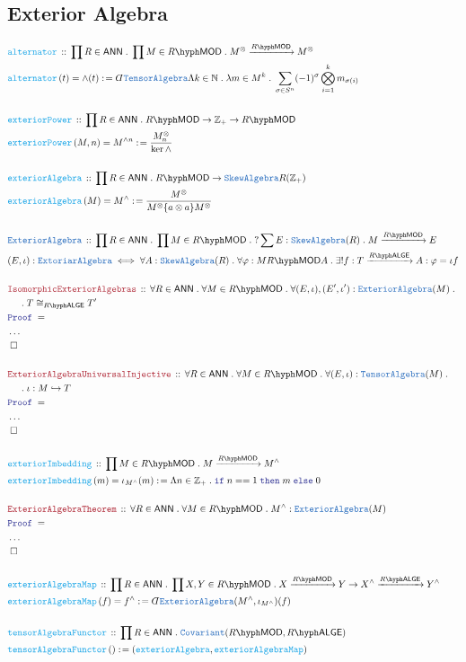 \documentclass[12pt]{scrartcl}%
\newcommand{\TYPE}[1]{\textcolor{NavyBlue}{\mathtt{#1}}}%
\newcommand{\FUNC}[1]{\textcolor{Cerulean}{\mathtt{#1}}}%
\newcommand{\LOGIC}[1]{\textcolor{Blue}{\mathtt{#1}}}%
\newcommand{\THM}[1]{\textcolor{Maroon}{\mathtt{#1}}}%
\renewcommand{\.}{\; . \;} %
\newcommand{\de}{: \kern 0.1pc =} %
\newcommand{\If}{\LOGIC{if} \;} %
\newcommand{\Then}{ \; \LOGIC{then} \;} %
\newcommand{\Else}{\; \LOGIC{else} \;} %
\newcommand{\Act}[1]{\left( #1 \right)} %
\newcommand{\Theorem}[2]{& \THM{#1} \, :: \, #2 \\ & \Proof = \\ } %
\newcommand{\DeclareType}[2]{& \TYPE{#1} \, :: \, #2 \\}%
\newcommand{\DefineType}[3]{& #1 : \TYPE{#2} \iff #3 \\}%
\newcommand{\DeclareFunc}[2]{& \FUNC{#1} \, :: \, #2 \\}%
\newcommand{\DefineFunc}[3]{&  \FUNC{#1}\Act{#2} \de #3 \\}%
\newcommand{\DefineNamedFunc}[4]{&  \FUNC{#1}\Act{#2} = #3 \de #4 \\}%
\newcommand{\NewLine}{\\ & \kern 1pc}%
\newcommand{\Page}[1]{ \begin{align*} #1 \end{align*}  }%
\newcommand{ \bd }{ \ByDef }%
\newcommand{\NoProof}{ & \ldots \\ \EndProof}%
\newcommand{\Int}{\mathbb{Z}}%
\newcommand{\Nat}{\mathbb{N}}%
\newcommand{\ToInj}{\hookrightarrow} %
\newcommand{\QED}{\; \square} %
\newcommand{\EndProof}{& \QED \\} %
\newcommand{\ByDef}{\rotatebox[origin=c]{-180}{$D$}}%
\newcommand{\Proof}{\LOGIC{Proof} \; } %
\newcommand{\Arrow}[1]{\xrightarrow{#1}}%
\newcommand{\Cov}{\TYPE{Covariant}}%
\newcommand{\LMOD}[1]{#1\hyph\mathsf{MOD}} %
\newcommand{\ANN}{\mathsf{ANN}} %
\newcommand{\LALGE}[1]{#1\hyph\mathsf{ALGE}}%
\begin{document}
\subsection{Exterior Algebra}
\Page{
	\DeclareFunc{alternator}{ \prod R \in \ANN \. \prod M \in \LMOD{R} \. M^\otimes \Arrow{\LMOD{R}} M^\otimes}
	\DefineNamedFunc{alternator}{ t }{ \wedge(t) }{ \bd \TYPE{TensorAlgebra} \Lambda k \in \Nat \. \lambda m \in M^k \. \sum_{\sigma \in S^n} (-1)^\sigma \bigotimes^k_{i=1} m_{\sigma(i)} } 
	\\
	\DeclareFunc{exteriorPower}{\prod R \in \ANN \. \LMOD{R} \to \Int_+ \to \LMOD{R}}
	\DefineNamedFunc{exteriorPower}{ M,n  }{ M^{\wedge n} }{ \frac{M^\otimes_n}{\ker \wedge}   }
	\\
	\DeclareFunc{exteriorAlgebra}{\prod R \in \ANN \. \LMOD{R}  \to \TYPE{SkewAlgebra}{R}(\Int_+)}
	\DefineNamedFunc{exteriorAlgebra}{ M  }{ M^{\wedge } }{ \frac{M^\otimes}{M^\otimes\{ a \otimes a\} M^\otimes} }
	\\
	\DeclareType{ExteriorAlgebra}{\prod R \in \ANN \. \prod M \in \LMOD{R} \. ?\sum E : \TYPE{SkewAlgebra}(R) \.  M  \Arrow{\LMOD{R}} E }
	\DefineType{(E,\iota)}{ExtoriarAlgebra}{\forall A : \TYPE{SkewAlgebra}(R) \. \forall \varphi : M \LMOD{R} A \. \exists! f : T \Arrow{\LALGE{R}} A : \varphi = \iota f  }
	\\
	\Theorem{IsomorphicExteriorAlgebras}{\forall R \in \ANN \. \forall M \in \LMOD{R} \.  \forall (E,\iota),(E',\iota') : \TYPE{ExteriorAlgebra}(M) \. 
		\NewLine \. T \cong_{\LALGE{R}} T'}
	\NoProof
	\\
	\Theorem{ExteriorAlgebraUniversalInjective}{\forall R \in \ANN \. \forall M \in \LMOD{R} \. \forall (E,\iota) : \TYPE{TensorAlgebra}(M) \. \NewLine \. \iota : M \ToInj T }
	\NoProof
	\\
	\DeclareFunc{exteriorImbedding}{ \prod M \in \LMOD{R} \. M \Arrow{\LMOD{R}} M^\wedge}
	\DefineNamedFunc{exteriorImbedding}{m}{\iota_{M^\wedge}(m)}{\Lambda n \in \Int_+ \.  \If n == 1 \Then m \Else 0}
	\\
	\Theorem{ExteriorAlgebraTheorem}{\forall R \in \ANN \. \forall M \in \LMOD{R} \. M^{\wedge} : \TYPE{ExteriorAlgebra}(M)}
	\NoProof
	\\
	\DeclareFunc{exteriorAlgebraMap}{\prod R \in \ANN \. \prod X,Y \in \LMOD{R} \.  X \Arrow{\LMOD{R}} Y \to  X^\wedge \Arrow{\LALGE{R}} Y^\wedge }
	\DefineNamedFunc{exteriorAlgebraMap}{f}{f^\wedge}{\bd \TYPE{ExteriorAlgebra}(M^\wedge,\iota_{M^\wedge})(f)  }                                
	\\
	\DeclareFunc{tensorAlgebraFunctor}{\prod R \in \ANN \. \Cov(\LMOD{R},\LALGE{R})}
	\DefineFunc{tensorAlgebraFunctor}{}{ (\FUNC{exteriorAlgebra}, \FUNC{exteriorAlgebraMap}) }
}
\end{document}
